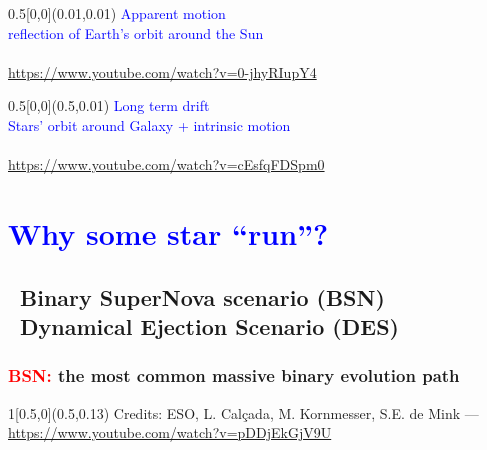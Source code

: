 \documentclass[xcolor=dvipsnames,professionalfonts, aspectratio=169]{beamer}
\begin{document}
\begin{frame}[c,plain]
  \begin{textblock}{0.5}[0,0](0.01,0.01)
    \centering
    \textcolor{Blue}{{\large Apparent motion}\\
      {\small reflection of Earth's orbit around the Sun}}\\[70pt]
    \vfill
      \\
      \textcolor{gray!50}{\tiny \url{https://www.youtube.com/watch?v=0-jhyRIupY4}}
    \end{textblock}
    \begin{textblock}{0.5}[0,0](0.5,0.01)
      \centering
      \textcolor{Blue}{{\large Long term drift}\\
        {\small Stars' orbit around Galaxy + intrinsic motion}}\\[68pt]
      \vfill
      \\
      \textcolor{gray!50}{\tiny \url{https://www.youtube.com/watch?v=cEsfqFDSpm0}}
  \end{textblock}
\end{frame}



\section{\textcolor{Blue}{Why some star ``run''?}}
\subsection{\textcolor{Blue}{\textbullet}~Binary SuperNova scenario
  (BSN) \\\textcolor{Blue}{\textbullet}~Dynamical Ejection Scenario (DES)}


\begin{frame}
  \frametitle{\textcolor{red}{BSN:} the most common massive binary evolution path}
  \centering
  \vspace*{8pt}


  \begin{textblock}{1}[0.5,0](0.5,0.13)
    \textcolor{gray!50}{\tiny Credits: ESO, L. Calçada, M. Kornmesser,
      S.E. de Mink  --- \url{https://www.youtube.com/watch?v=pDDjEkGjV9U}}
  \end{textblock}
\end{frame}
\end{document}

